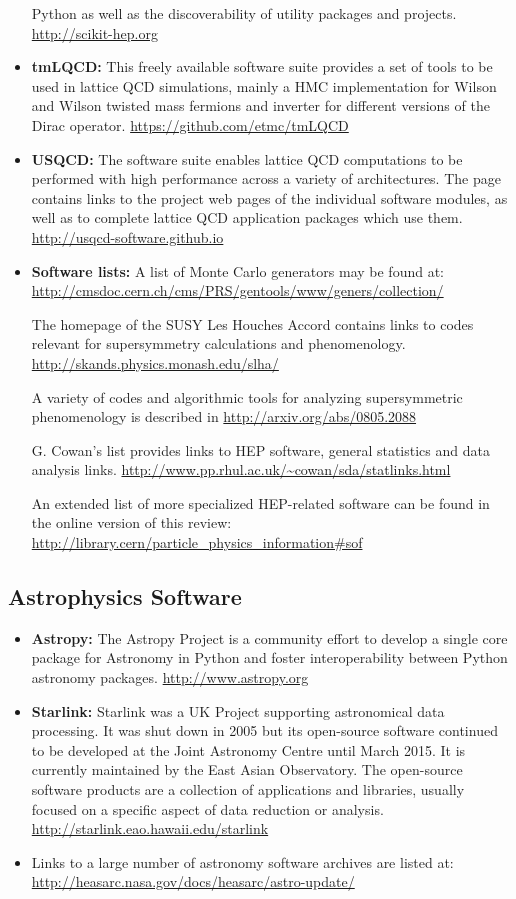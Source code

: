 \begin{itemize}
  Python as well as the discoverability of utility packages and
  projects. \url{http://scikit-hep.org}
\item
  \textbf{tmLQCD:} This freely available software suite provides a set
  of tools to be used in lattice QCD simulations, mainly a HMC
  implementation for Wilson and Wilson twisted mass fermions and
  inverter for different versions of the Dirac operator.
  \url{https://github.com/etmc/tmLQCD}
\item
  \textbf{USQCD:} The software suite enables lattice QCD computations to
  be performed with high performance across a variety of architectures.
  The page contains links to the project web pages of the individual
  software modules, as well as to complete lattice QCD application
  packages which use them. \url{http://usqcd-software.github.io}
\item
  \textbf{Software lists:} A list of Monte Carlo generators may be found
  at:
  \url{http://cmsdoc.cern.ch/cms/PRS/gentools/www/geners/collection/}

  The homepage of the SUSY Les Houches Accord contains links to codes
  relevant for supersymmetry calculations and phenomenology.
  \url{http://skands.physics.monash.edu/slha/}

  A variety of codes and algorithmic tools for analyzing supersymmetric
  phenomenology is described in \url{http://arxiv.org/abs/0805.2088}

  G. Cowan's list provides links to HEP software, general statistics and
  data analysis links.
  \url{http://www.pp.rhul.ac.uk/~cowan/sda/statlinks.html}

  An extended list of more specialized HEP-related software can be found
  in the online version of this review:
  \url{http://library.cern/particle_physics_information\#sof}
\end{itemize}

\subsection{Astrophysics Software}\label{databases:subsec:astrophysics}

\begin{itemize}
\item
  \textbf{Astropy:} The Astropy Project is a community effort to develop
  a single core package for Astronomy in Python and foster
  interoperability between Python astronomy packages.
  \url{http://www.astropy.org}
\item
  \textbf{Starlink:} Starlink was a UK Project supporting astronomical
  data processing. It was shut down in 2005 but its open-source software
  continued to be developed at the Joint Astronomy Centre until March
  2015. It is currently maintained by the East Asian Observatory. The
  open-source software products are a collection of applications and
  libraries, usually focused on a specific aspect of data reduction or
  analysis. \url{http://starlink.eao.hawaii.edu/starlink}
\item
  Links to a large number of astronomy software archives are listed at:
  \url{http://heasarc.nasa.gov/docs/heasarc/astro-update/}
\end{itemize}

